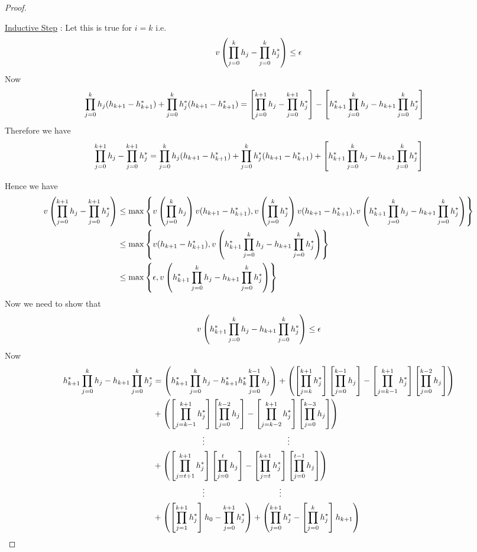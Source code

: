 \begin{proof}
\begin{enumerate}[label=(\roman*)]
		\underline{Inductive Step} : Let this is true for $i=k$ i.e.$$v\left(\prod_{j=0}^kh_j-\prod_{j=0}^k h_j^*  \right)\leq \epsilon$$Now\begin{align*}
			\prod_{j=0}^kh_j(h_{k+1}-h_{k+1}^*)+\prod_{j=0}^kh_j^*(h_{k+1}-h_{k+1}^*) &=\left[\prod_{j=0}^{k+1}h_j-\prod_{j=0}^{k+1}h_j^*\right] -\left[ h_{k+1}^*\prod_{j=0}^kh_j-h_{k+1}\prod_{j=0}^{k}h_j^*  \right]
		\end{align*}Therefore we have $$\prod_{j=0}^{k+1}h_j-\prod_{j=0}^{k+1}h_j^*=	\prod_{j=0}^kh_j(h_{k+1}-h_{k+1}^*)+\prod_{j=0}^kh_j^*(h_{k+1}-h_{k+1}^*)+ \left[ h_{k+1}^*\prod_{j=0}^kh_j-h_{k+1}\prod_{j=0}^{k}h_j^*  \right]  $$
	\end{enumerate}Hence we have \begin{align*}
	v\left(  \prod_{j=0}^{k+1}h_j-\prod_{j=0}^{k+1}h_j^* \right)& \leq \max\left\{ v\left(\prod_{j=0}^kh_j\right)v(h_{k+1}-h_{k+1}^*), v\left(\prod_{j=0}^kh_j^*\right)v(h_{k+1}-h_{k+1}^*),v\left( h_{k+1}^*\prod_{j=0}^kh_j-h_{k+1}\prod_{j=0}^{k}h_j^*  \right)  \right\}\\
	& \leq \max \left\{v(h_{k+1}-h_{k+1}^*), v\left( h_{k+1}^*\prod_{j=0}^kh_j-h_{k+1}\prod_{j=0}^{k}h_j^*  \right)  \right\}\\
	& \leq \max\left\{ \epsilon, v\left( h_{k+1}^*\prod_{j=0}^kh_j-h_{k+1}\prod_{j=0}^{k}h_j^*  \right)   \right\}
	\end{align*}Now we need to show that $$ v\left( h_{k+1}^*\prod\limits_{j=0}^kh_j-h_{k+1}\prod\limits_{j=0}^{k}h_j^*  \right)  \leq \epsilon$$Now
	\begin{align*}
		 h_{k+1}^*\prod_{j=0}^kh_j-h_{k+1}\prod_{j=0}^{k}h_j^*   & = \lt( h_{k+1}^*\prod_{j=0}^k h_j-h_{k+1}^*h_k^*\prod_{j=0}^{k-1}h_j \rt)         +         \lt( \lt[\prod_{j=k}^{k+1}h_j^*\rt]\lt[\prod_{j=0}^{k-1}h_j  \rt]-\lt[\prod_{j=k-1}^{k+1}h_j^*\rt]\lt[\prod_{j=0}^{k-2}h_j  \rt]\rt)\\
		 & + \lt( \lt[\prod_{j=k-1}^{k+1}h_j^*\rt]\lt[\prod_{j=0}^{k-2}h_j  \rt]-\lt[\prod_{j=k-2}^{k+1}h_j^*\rt]\lt[\prod_{j=0}^{k-3}h_j  \rt]\rt)\\
		 & \qquad\qquad \qquad\vdots\qquad\qquad \qquad\qquad\qquad\vdots\\
		 &+ \lt( \lt[\prod_{j=t+1}^{k+1}h_j^*\rt]\lt[\prod_{j=0}^{t}h_j  \rt]-\lt[\prod_{j=t}^{k+1}h_j^*\rt]\lt[\prod_{j=0}^{t-1}h_j  \rt]\rt)\\
		 & \qquad\qquad \qquad\vdots\qquad\qquad \qquad\qquad\quad\vdots\\
		 & + \lt( \lt[\prod_{j=1}^{k+1}h_j^*\rt]h_0  -\prod_{j=0}^{k+1}h_j^*\rt)+\lt(\prod_{j=0}^{k+1}h_j^*  -\lt[\prod_{j=0}^{k}h_j^*\rt]h_{k+1}  \rt)\\

\end{align*}
\end{proof}
